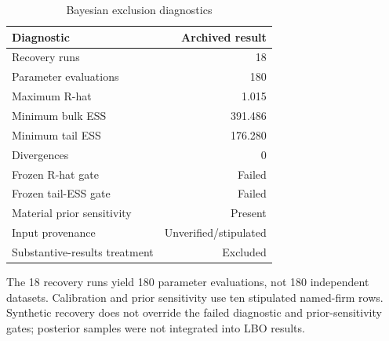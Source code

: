 \begin{table}[htbp]\centering\small
\caption{Bayesian exclusion diagnostics}\label{tab:A1}
\begin{tabular}{lr}
\toprule
Diagnostic & Archived result \\
\midrule
Recovery runs & 18 \\
Parameter evaluations & 180 \\
Maximum R-hat & 1.015 \\
Minimum bulk ESS & 391.486 \\
Minimum tail ESS & 176.280 \\
Divergences & 0 \\
Frozen R-hat gate & Failed \\
Frozen tail-ESS gate & Failed \\
Material prior sensitivity & Present \\
Input provenance & Unverified/stipulated \\
Substantive-results treatment & Excluded \\
\bottomrule
\end{tabular}
\par\smallskip
\begin{minipage}{\linewidth}\footnotesize The 18 recovery runs yield 180 parameter evaluations, not 180 independent datasets. Calibration and prior sensitivity use ten stipulated named-firm rows. Synthetic recovery does not override the failed diagnostic and prior-sensitivity gates; posterior samples were not integrated into LBO results.\end{minipage}
\end{table}
